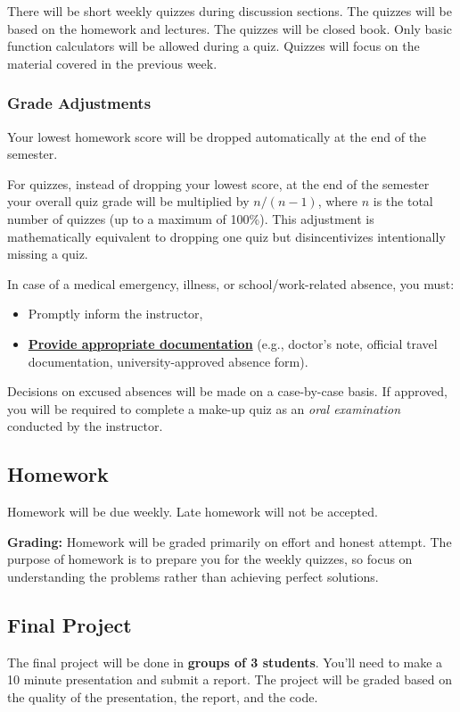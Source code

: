 \documentclass{article}
\begin{document}
There will be short weekly quizzes during discussion sections. The quizzes will be based on the homework and lectures. The quizzes will be closed book. Only basic function calculators will be allowed during a quiz. Quizzes will focus on the material covered in the previous week.

\subsubsection{Grade Adjustments}

Your lowest homework score will be dropped automatically at the end of the semester. 

For quizzes, instead of dropping your lowest score, at the end of the semester your overall quiz grade will be multiplied by $n/(n-1)$, where $n$ is the total number of quizzes (up to a maximum of 100\%). This adjustment is mathematically equivalent to dropping one quiz but disincentivizes intentionally missing a quiz.

In case of a medical emergency, illness, or school/work-related absence, you must:
\begin{itemize}
    \item Promptly inform the instructor,
    \item \underline{\textbf{Provide appropriate documentation}} (e.g., doctor's note, official travel documentation, university-approved absence form).
\end{itemize}

Decisions on excused absences will be made on a case-by-case basis. If approved, you will be required to complete a make-up quiz as an \emph{oral examination} conducted by the instructor.
\subsection{Homework}

Homework will be due weekly. Late homework will not be accepted.

\textbf{Grading:} Homework will be graded primarily on effort and honest attempt. The purpose of homework is to prepare you for the weekly quizzes, so focus on understanding the problems rather than achieving perfect solutions.

\subsection{Final Project}

The final project will be done in \textbf{groups of 3 students}. You'll need to make a 10 minute presentation and submit a report. The project will be graded based on the quality of the presentation, the report, and the code. 
\end{document}
